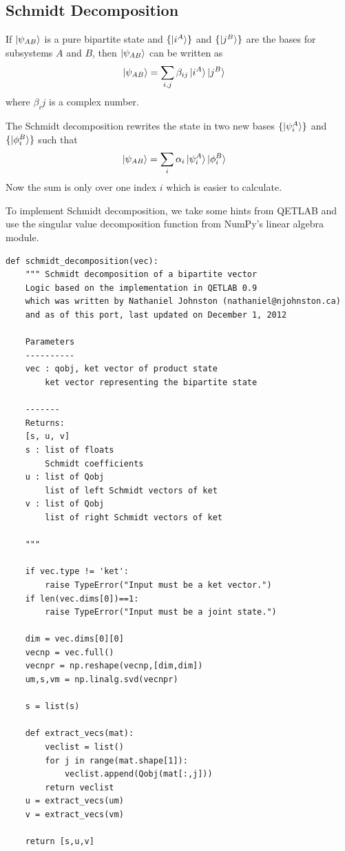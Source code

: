\subsection{Schmidt Decomposition}
If $\ket{\psi_{AB}}$ is a pure bipartite state and $\{\ket{i^A}\}$ and $\{\ket{j^B}\}$ are the bases for subsystems $A$ and $B$, then $\ket{\psi_{AB}}$ can be written as
\begin{align*}
\ket{\psi_{AB}} &= \sum_{i,j} \beta_{ij} \ket{i^A} \ket{j^B}
\end{align*}
where $\beta_ij$ is a complex number.
\par The Schmidt decomposition rewrites the state in two new bases $\{\ket{\psi_i^A}\}$ and $\{\ket{\phi_i^B}\}$ such that
\begin{align*}
\ket{\psi_{AB}} &= \sum_{i} \alpha_i \ket{\psi_i^A} \ket{\phi_i^B}
\end{align*}
Now the sum is only over one index $i$ which is easier to calculate.
\par To implement Schmidt decomposition, we take some hints from QETLAB and use the singular value decomposition function from NumPy's linear algebra module.
\begin{verbatim}
def schmidt_decomposition(vec):
    """ Schmidt decomposition of a bipartite vector
    Logic based on the implementation in QETLAB 0.9
    which was written by Nathaniel Johnston (nathaniel@njohnston.ca)
    and as of this port, last updated on December 1, 2012
    
    Parameters
    ----------
    vec : qobj, ket vector of product state
        ket vector representing the bipartite state
    
    -------
    Returns:
    [s, u, v]
    s : list of floats
        Schmidt coefficients
    u : list of Qobj
        list of left Schmidt vectors of ket
    v : list of Qobj
        list of right Schmidt vectors of ket
    
    """
    
    if vec.type != 'ket':
        raise TypeError("Input must be a ket vector.")
    if len(vec.dims[0])==1:
        raise TypeError("Input must be a joint state.")
    
    dim = vec.dims[0][0]
    vecnp = vec.full()
    vecnpr = np.reshape(vecnp,[dim,dim])
    um,s,vm = np.linalg.svd(vecnpr)
    
    s = list(s)
    
    def extract_vecs(mat):
        veclist = list()
        for j in range(mat.shape[1]):
            veclist.append(Qobj(mat[:,j]))
        return veclist
    u = extract_vecs(um)
    v = extract_vecs(vm)
    
    return [s,u,v]
\end{verbatim}

